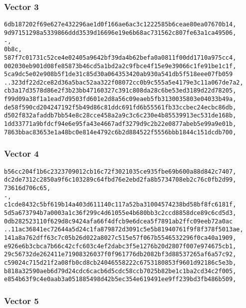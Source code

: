 \documentclass[
]{article}
\begin{document}
\hypertarget{vector-3-1}{%
\subsubsection{Vector 3}\label{vector-3-1}}

\begin{verbatim}
6db187202f69e627e432296ae1d0f166ae6ac3c1222585b6ceae80ea07670b14,
9d97151298a5339866ddd3539d16696e19e6b68ac731562c807fe63a1ca49506,
-,
0b8c,
587f7c01731c52ce4e02405a9642bf39da4b62befa0a0811f00dd1710a975cc4,
002030eb901d08fe85873b46cd5a1bd2a2c9fbce4f15e9e39066c1fe91be1c1f,
5ca9dc5e02e908b5f1de31c85d30a064353420ab930a541db5f518eee07fb059
..323df22d2ce82d36a5bac52aa322f08072cc0b9c555a5e4179e3c11a067de7a2,
cb3a17d3578d86e2f3b23bb47160327c391c808da28c6be53ed3189d22d78205,
f99d09a38f1a1ead7d9503fd601e2d8a56c09eaeb5fb3130035803e04033b49a,
de58f590cd204247192f5b49d86c81ddc691fd6b55561fb33ccbec24ecbc86db,
d502f832afaddb7bb54e8c28cce458a2a9c3c6c230e4b85539913ec531de168b,
1dd33771a9bfdcf94e6e95fa43e4667adf3279d9c2b22e0877abeb5e99a9e01b,
7863bbac83653e1a48bc0e814e4792c6b2d884522f5556bbb1844c151dcdb700,
\end{verbatim}

\hypertarget{vector-4-1}{%
\subsubsection{Vector 4}\label{vector-4-1}}

\begin{verbatim}
b56cc204f1b6c2323709012cb16c72f3021035ce935fbe69b600a88d842c7407,
dc2de7312c2850a9f6c103289c64fbd76e2ebd2fa8b5734708eb2c76c0fb2d99,
73616d706c65,
-,
c1cde8432c5bf619b14a403d611140c117a52ba31004574238bd58bf8fc6181f,
5d5a673794b7a0003a1c36f299c4d61055e4b680bb3c2ccd8858dce89c6cd5d3,
0db282523110f629d8c9424afa66f4dfcb9e6dcea5f7891ab2ffc09eeb72a0ac
..11ac36841ec72644a5d24c1fa879872d3091c5e5b81940761f9f8f378f5013ae,
141a8a762dff63c7c05b26d022a8027c515e57f067b5546532296f0ca40a1909,
e926e6b3cbca7b66c42cfc603c4ef2dabc3f5e1276b20d2807f007e974675cb1,
29c56732de262411e71908326037f0f961776db2082bf3d88537265af6a57c92,
c59024c715d21f2a08fb0cd8cb24046558222c6753180853f9601d92186c5e3b,
b818a32590aeb6d79d24cdc6cacb6d5cdc58ccb7025b82be1c1ba2cd34c2f005,
e854b63f9c4e0aab3a051885498d42b5ec354e619491ee9ff239bd3fb486b509,
\end{verbatim}

\hypertarget{vector-5-1}{%
\subsubsection{Vector 5}\label{vector-5-1}}
\end{document}
